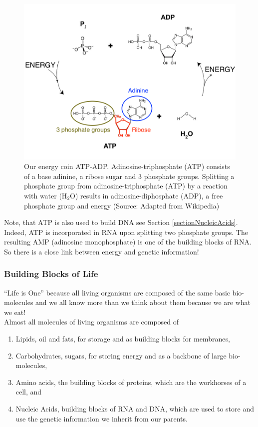 \documentclass[
  11pt,
]{book}
\providecommand{\tightlist}{%
  \setlength{\itemsep}{0pt}\setlength{\parskip}{0pt}}
\begin{document}
\begin{figure}

{\centering \includegraphics[width=0.7\linewidth]{./figs/ATP-ADP} 

}

\caption{Our energy coin ATP-ADP. Adinosine-triphosphate (ATP) consists of a base adinine, a ribose sugar and 3 phosphate groups. Splitting a phosphate group from adinosine-triphosphate (ATP) by a reaction with water (H\(_2\)O) results in adinosine-diphosphate (ADP), a free phosphate group and energy (Source: Adapted from Wikipedia)}\label{fig:atp-adp}
\end{figure}

Note, that ATP is also used to build DNA see Section \ref{sectionNucleicAcids}. Indeed, ATP is incorporated in RNA upon splitting two phosphate groups. The resulting AMP (adinosine monophosphate) is one of the building blocks of RNA. So there is a close link between energy and genetic information!

\hypertarget{building-blocks-of-life}{%
\subsubsection{Building Blocks of Life}\label{building-blocks-of-life}}

``Life is One'' because all living organisms are composed of the same basic bio-molecules and we all know more than we think about them because we are what we eat!\\
Almost all molecules of living organisms are composed of

\begin{enumerate}
\def\labelenumi{\arabic{enumi}.}
\tightlist
\item
  Lipids, oil and fats, for storage and as building blocks for membranes,
\item
  Carbohydrates, sugars, for storing energy and as a backbone of large bio-molecules,
\item
  Amino acids, the building blocks of proteins, which are the workhorses of a cell, and
\item
  Nucleic Acids, building blocks of RNA and DNA, which are used to store and use the genetic information we inherit from our parents.
\end{enumerate}
\end{document}
